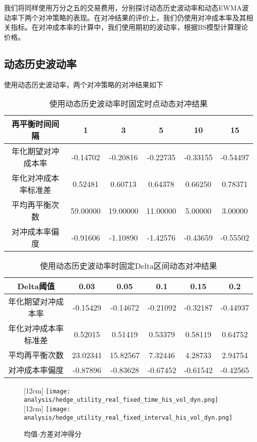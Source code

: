 我们将同样使用万分之五的交易费用，分别探讨动态历史波动率和动态EWMA波动率下两个对冲策略的表现。在对冲结果的评价上，我们仍使用对冲成本率及其相关指标。在对冲成本率的计算中，我们使用期初的波动率，根据BS模型计算理论价格。

\subsection{动态历史波动率}

使用动态历史波动率，两个对冲策略的对冲结果如下

\begin{table}[htbp]
  \centering
  \caption{使用动态历史波动率时固定时点动态对冲结果}
  \label{tab:fixed_time_5_his_vol_dyn}
  \begin{tabular}{cccccc}
    \toprule
    再平衡时间间隔 & 1 & 3 & 5 & 10 & 15 \\
    \midrule
    年化期望对冲成本率 & -0.14702 & -0.20816 & -0.22735 & -0.33155 & -0.54497 \\
    年化对冲成本率标准差 & 0.52481 & 0.60713 & 0.64378 & 0.66250 & 0.78371 \\
    平均再平衡次数 & 59.00000 & 19.00000 & 11.00000 & 5.00000 & 3.00000 \\
    对冲成本率偏度 & -0.91606 & -1.10890 & -1.42576 & -0.43659 & -0.55502 \\
    \bottomrule
  \end{tabular}
\end{table}

\begin{table}[htbp]
  \centering
  \caption{使用动态历史波动率时固定Delta区间动态对冲结果}
  \label{tab:fixed_interval_5_his_vol_dyn}
  \begin{tabular}{cccccc}
    \toprule
    Delta阈值 & 0.03 & 0.05 & 0.1 & 0.15 & 0.2 \\
    \midrule
    年化期望对冲成本率 & -0.15429 & -0.14672 & -0.21092 & -0.32187 & -0.44937 \\
    年化对冲成本率标准差 & 0.52015 & 0.51419 & 0.53379 & 0.58119 & 0.64752 \\
    平均再平衡次数 & 23.02341 & 15.82567 & 7.32446 & 4.28733 & 2.94754 \\
    对冲成本率偏度 & -0.87896 & -0.83628 & -0.67452 & -0.61542 & -0.42565 \\
    \bottomrule
  \end{tabular}
\end{table}

\begin{figure}[htb]
  \centering
  [12cm]
    {\texttt{[image: analysis/hedge\_utility\_real\_fixed\_time\_his\_vol\_dyn.png]}}
  \hspace{0.5cm}
  [12cm]
    {\texttt{[image: analysis/hedge\_utility\_real\_fixed\_interval\_his\_vol\_dyn.png]}}
    \caption[这里将出现在插图索引中]
    {均值-方差对冲得分}
  \label{fig:hedge_utility_real_his_dyn}
\end{figure}


